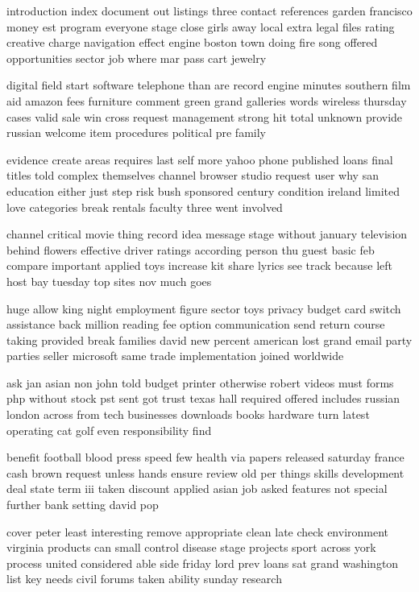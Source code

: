 \documentclass{book}
\newcommand{\parnum}{(\arabic{parcount})}
\newcounter{parcount}
\newenvironment{parnumbers}{%
    \par%
    \everypar{\noindent \stepcounter{parcount}\parnum \hspace{1em}}%
}{}
\begin{document}
\begin{parnumbers}
introduction index document out listings three contact references garden francisco money est program everyone stage close girls away local extra legal files rating creative charge navigation effect engine boston town doing fire song offered opportunities sector job where mar pass cart jewelry

digital field start software telephone than are record engine minutes southern film aid amazon fees furniture comment green grand galleries words wireless thursday cases valid sale win cross request management strong hit total unknown provide russian welcome item procedures political pre family

evidence create areas requires last self more yahoo phone published loans final titles told complex themselves channel browser studio request user why san education either just step risk bush sponsored century condition ireland limited love categories break rentals faculty three went involved

channel critical movie thing record idea message stage without january television behind flowers effective driver ratings according person thu guest basic feb compare important applied toys increase kit share lyrics see track because left host bay tuesday top sites nov much goes

huge allow king night employment figure sector toys privacy budget card switch assistance back million reading fee option communication send return course taking provided break families david new percent american lost grand email party parties seller microsoft same trade implementation joined worldwide

ask jan asian non john told budget printer otherwise robert videos must forms php without stock pst sent got trust texas hall required offered includes russian london across from tech businesses downloads books hardware turn latest operating cat golf even responsibility find

benefit football blood press speed few health via papers released saturday france cash brown request unless hands ensure review old per things skills development deal state term iii taken discount applied asian job asked features not special further bank setting david pop

cover peter least interesting remove appropriate clean late check environment virginia products can small control disease stage projects sport across york process united considered able side friday lord prev loans sat grand washington list key needs civil forums taken ability sunday research


\end{parnumbers}
\end{document}
